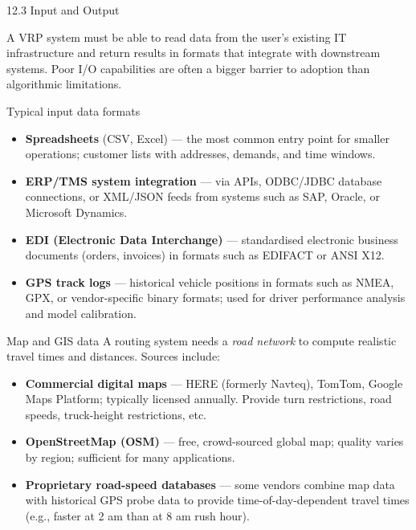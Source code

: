 \documentclass[aspectratio=169,10pt]{beamer}
\begin{document}
\begin{frame}[allowframebreaks]{12.3 \; Input and Output}

  A VRP system must be able to read data from the user's existing IT
  infrastructure and return results in formats that integrate with downstream
  systems.
  Poor I/O capabilities are often a bigger barrier to adoption than algorithmic
  limitations.

  \begin{block}{Typical input data formats}
    \begin{itemize}
      \item \textbf{Spreadsheets} (CSV, Excel) --- the most common entry
            point for smaller operations; customer lists with addresses,
            demands, and time windows.
      \item \textbf{ERP/TMS system integration} --- via APIs, ODBC/JDBC
            database connections, or XML/JSON feeds from systems such as
            SAP, Oracle, or Microsoft Dynamics.
      \item \textbf{EDI (Electronic Data Interchange)} --- standardised
            electronic business documents (orders, invoices) in formats
            such as EDIFACT or ANSI X12.
      \item \textbf{GPS track logs} --- historical vehicle positions in
            formats such as NMEA, GPX, or vendor-specific binary formats;
            used for driver performance analysis and model calibration.
    \end{itemize}
  \end{block}

  \framebreak

  \begin{block}{Map and GIS data}
    A routing system needs a \emph{road network} to compute realistic travel
    times and distances.
    Sources include:
    \begin{itemize}
      \item \textbf{Commercial digital maps} --- HERE (formerly Navteq),
            TomTom, Google Maps Platform; typically licensed annually.
            Provide turn restrictions, road speeds, truck-height
            restrictions, etc.
      \item \textbf{OpenStreetMap (OSM)} --- free, crowd-sourced global
            map; quality varies by region; sufficient for many applications.
      \item \textbf{Proprietary road-speed databases} --- some vendors
            combine map data with historical GPS probe data to provide
            time-of-day-dependent travel times (e.g., faster at 2 am
            than at 8 am rush hour).
    \end{itemize}
  \end{block}


\end{frame}
\end{document}
